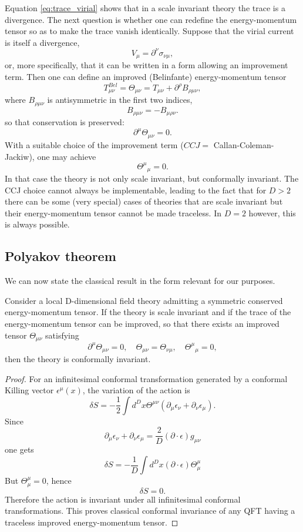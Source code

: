 Equation \eqref{eq:trace_virial} shows that in a scale invariant theory the trace is a divergence. The next question is whether one can redefine the energy-momentum tensor so as to make the trace vanish identically.
Suppose that the virial current is itself a divergence,
\[
    V_{\mu}=\partial^{\nu}\sigma_{\nu\mu},
\]
or, more specifically, that it can be written in a form allowing an improvement term.
Then one can define an improved (Belinfante) energy-momentum tensor
\begin{equation}
    T_{\mu\nu}^{Bel} = \Theta_{\mu\nu} = T_{\mu\nu}+\partial^{\rho}B_{\rho\mu\nu},
    \label{eq:Belinfante_energy_momentum_tensor}
\end{equation}
where \(B_{\rho\mu\nu}\) is antisymmetric in the first two indices,
\[
    B_{\rho\mu\nu}=-B_{\mu\rho\nu}.
\]
so that conservation is preserved:
\[
    \partial^{\mu}\Theta_{\mu\nu}=0.
\]
With a suitable choice of the improvement term (\(CCJ=\) Callan-Coleman-Jackiw), one may achieve
\[
    {\Theta^{\mu}}_{\mu}=0.
\]
In that case the theory is not only scale invariant, but conformally invariant. The CCJ choice cannot always be implementable, leading to the fact that for \(D>2\) there can be some (very special) cases of theories that are scale invariant but their energy-momentum tensor cannot be made traceless. In \(D=2\) however, this is always possible.

\subsection{Polyakov theorem}
We can now state the classical result in the form relevant for our purposes.

\begin{theorem}
    Consider a local D-dimensional field theory admitting a symmetric conserved energy-momentum tensor. If the theory is scale invariant and if the trace of the energy-momentum tensor can be improved, so that there exists an improved tensor \(\Theta_{\mu\nu}\) satisfying
    \[
        \partial^{\mu}\Theta_{\mu\nu}=0, \quad \Theta_{\mu\nu}=\Theta_{\nu\mu}, \quad {\Theta^{\mu}}_{\mu}=0,
    \]
    then the theory is conformally invariant.
\end{theorem}

\begin{proof}
    For an infinitesimal conformal transformation generated by a conformal Killing vector \(\epsilon^{\mu}(x)\), the variation of the action is
    \[
        \delta S=-\frac{1}{2}\int d^{D}x\Theta^{\mu\nu}(\partial_{\mu}\epsilon_{\nu}+\partial_{\nu}\epsilon_{\mu}).
    \]
    Since
    \[
        \partial_{\mu}\epsilon_{\nu}+\partial_{\nu}\epsilon_{\mu}=\frac{2}{D}(\partial\cdot\epsilon)g_{\mu\nu}
    \]
    one gets
    \[
        \delta S=-\frac{1}{D}\int d^{D}x(\partial\cdot\epsilon)\Theta_{\mu}^{\mu}
    \]
    But \(\Theta_{\mu}^{\mu}=0\), hence
    \[
        \delta S=0.
    \]
    Therefore the action is invariant under all infinitesimal conformal transformations.
    This proves classical conformal invariance of any QFT having a traceless improved energy-momentum tensor.
\end{proof}

